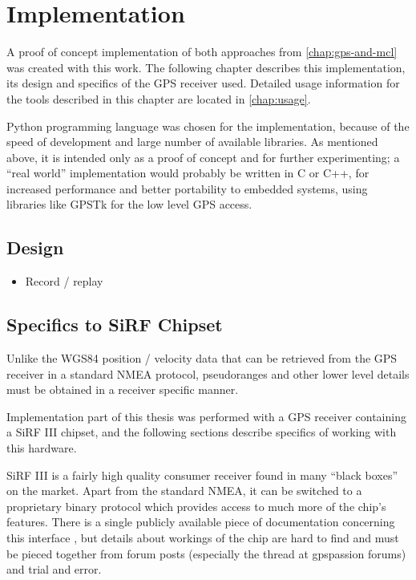 \chapter{Implementation}
\label{chap:implementation}

A proof of concept implementation of both approaches from \cref{chap:gps-and-mcl}
was created with this work.
The following chapter describes this implementation, its design and
specifics of the GPS receiver used.
Detailed usage information for the tools described in this chapter are located in
\cref{chap:usage}.

Python programming language was chosen for the implementation,
because of the speed of development and large number of available libraries.
As mentioned above, it is intended only as a proof of
concept and for further experimenting; a \enquote{real world} implementation
would probably be written in C or C++, for increased performance and better portability
to embedded systems, using libraries like GPSTk \cite{tolman04} for the low level GPS access.

\section{Design}
\begin{itemize}
\item Record / replay
\end{itemize}

\section{Specifics to SiRF Chipset}
\label{sec:impl-sirf}

Unlike the WGS84 position / velocity data that can be retrieved from the GPS receiver in a standard
NMEA protocol, pseudoranges and other lower level details must be obtained
in a receiver specific manner.

Implementation part of this thesis was performed with a GPS receiver containing
a SiRF III chipset, and the following sections describe specifics of working with
this hardware.

SiRF III is a fairly high quality consumer receiver found in many
\enquote{black boxes} on the market.
Apart from the standard NMEA, it can be switched to a proprietary binary protocol
which provides access to much more of the chip's features.
There is a single publicly available piece of documentation concerning this
interface \cite{sirf-protocol}, but details about workings of the chip are hard
to find and must be pieced together from forum posts (especially the thread
\cite{gpspassion-sirf} at gpspassion forums) and trial and error.


